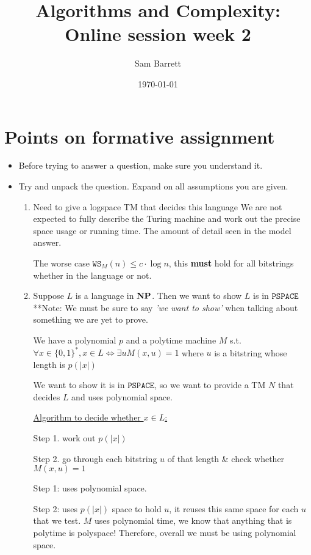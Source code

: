 \documentclass[11pt]{article}
\author{Sam Barrett}
\date{\today}
\title{Algorithms and Complexity: Online session week 2}
\begin{document}
\maketitle

\section{Points on formative assignment}
\label{sec:org93630b0}

\begin{itemize}
\item Before trying to answer a question, make sure you understand it.
\item Try and unpack the question. Expand on all assumptions you are given.

\begin{enumerate}
\item Need to give a logspace TM that decides this language
We are not expected to fully describe the Turing machine and work out the precise space usage or running time. The amount of detail seen in the model answer.

The worse case \(\texttt{WS}_{M}(n) \leq c \cdot \log n\), this \textbf{\textbf{must}} hold for all bitstrings whether in the language or not.

\item Suppose \(L\) is a language in \(\bf{NP}\). Then we want to show \(L\) is in \(\texttt{PSPACE}\)
**Note: We must be sure to say \emph{'we want to show'} when talking about something we are yet to prove.

We have a polynomial \(p\) and a polytime machine \(M\) s.t. \(\forall x \in \{ 0,1\}^{*}, x \in L \Longleftrightarrow \exists u M(x,u) = 1\) where \(u\) is a bitstring whose length is \(p (| x |)\)

We want to show it is in \(\texttt{PSPACE}\), so we want to provide a TM \(N\) that decides \(L\) and uses polynomial space.

\uline{Algorithm to decide whether \(x \in L\):}

Step 1. work out \(p(|x|)\)

Step 2. go through each bitstring \(u\) of that length \& check whether \(M(x,u) = 1\)

Step 1: uses polynomial space.

Step 2: uses \(p(|x|)\) space to hold \(u\), it reuses this same space for each \(u\) that we test. \(M\) uses polynomial time, we know that anything that is polytime is polyspace!
Therefore, overall we must be using polynomial space.


\end{enumerate}
\end{itemize}
\end{document}
